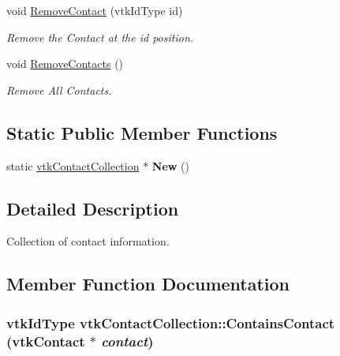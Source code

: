\begin{DoxyCompactItemize}
void \hyperlink{classvtkContactCollection_acb592cfee4ec93e6580d5a44da8b85c3}{RemoveContact} (vtkIdType id)
\begin{DoxyCompactList}\small\item\em Remove the Contact at the id position. \item\end{DoxyCompactList}\item 
void \hyperlink{classvtkContactCollection_a9b85a9624245a174cd43c2c12962fd0c}{RemoveContacts} ()
\begin{DoxyCompactList}\small\item\em Remove All Contacts. \item\end{DoxyCompactList}\end{DoxyCompactItemize}
\subsection*{Static Public Member Functions}
\begin{DoxyCompactItemize}
\item 
\hypertarget{classvtkContactCollection_a6ad4805a4d60d6754ea5b3f656af6bfc}{
static \hyperlink{classvtkContactCollection}{vtkContactCollection} $\ast$ {\bfseries New} ()}
\label{classvtkContactCollection_a6ad4805a4d60d6754ea5b3f656af6bfc}

\end{DoxyCompactItemize}


\subsection{Detailed Description}
Collection of contact information. 

\subsection{Member Function Documentation}
\hypertarget{classvtkContactCollection_a4cb4194315844f6db614c37efcb069d0}{
\subsubsection[{ContainsContact}]{\setlength{\rightskip}{0pt plus 5cm}vtkIdType vtkContactCollection::ContainsContact ({\bf vtkContact} $\ast$ {\em contact})}}
\label{classvtkContactCollection_a4cb4194315844f6db614c37efcb069d0}


